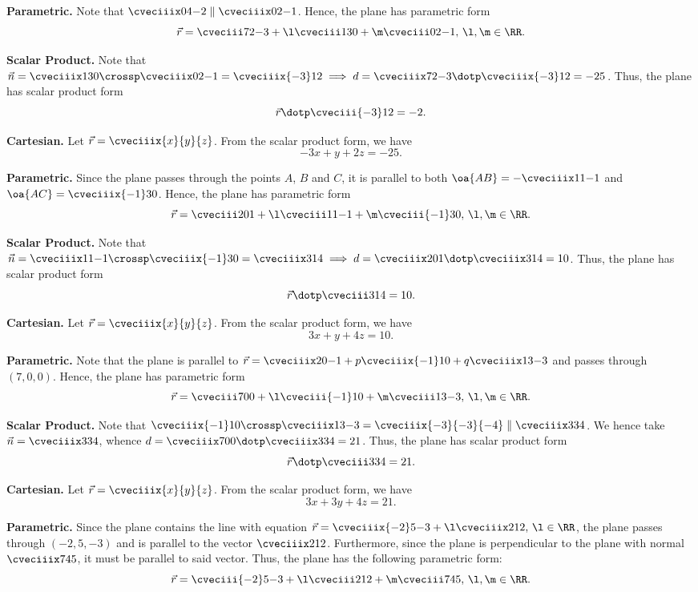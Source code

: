 \begin{solution}
    \begin{ppart}
        \textbf{Parametric.}
        Note that $\cveciiix04{-2} \parallel \cveciiix02{-1}$. Hence, the plane has parametric form \[\vec r = \cveciii72{-3} + \l\cveciii130 + \m\cveciii02{-1}, \, \l, \m \in \RR.\]

        \textbf{Scalar Product.}
        Note that $\vec n = \cveciiix130 \crossp \cveciiix02{-1} = \cveciiix{-3}12 \implies d = \cveciiix72{-3} \dotp \cveciiix{-3}12 = -25$. Thus, the plane has scalar product form \[\vec r \dotp \cveciii{-3}12 = -2.\]

        \textbf{Cartesian.} Let $\vec r = \cveciiix{x}{y}{z}$. From the scalar product form, we have \[-3x + y + 2z = -25.\]
    \end{ppart}
    \begin{ppart}
        \textbf{Parametric.} Since the plane passes through the points $A$, $B$ and $C$, it is parallel to both $\oa{AB} = -\cveciiix11{-1}$ and $\oa{AC}= \cveciiix{-1}30$. Hence, the plane has parametric form \[\vec r = \cveciii201 + \l\cveciii11{-1} + \m\cveciii{-1}30, \, \l, \m \in \RR.\]

        \textbf{Scalar Product.} Note that $\vec n = \cveciiix11{-1} \crossp \cveciiix{-1}30 = \cveciiix314 \implies d = \cveciiix201 \dotp \cveciiix314 = 10$. Thus, the plane has scalar product form \[\vec r \dotp \cveciii314 = 10.\]

        \textbf{Cartesian.} Let $\vec r = \cveciiix{x}{y}{z}$. From the scalar product form, we have \[3x + y + 4z = 10.\]
    \end{ppart}
    \begin{ppart}
        \textbf{Parametric.} Note that the plane is parallel to $\vec r = \cveciiix20{-1} + p\cveciiix{-1}10 + q\cveciiix13{-3}$ and passes through $(7, 0, 0)$. Hence, the plane has parametric form \[\vec r = \cveciii700 + \l\cveciii{-1}10 + \m\cveciii13{-3}, \, \l, \m \in \RR.\]

        \textbf{Scalar Product.} Note that $\cveciiix{-1}10 \crossp \cveciiix13{-3} = \cveciiix{-3}{-3}{-4} \parallel \cveciiix334$. We hence take $\vec n = \cveciiix334$, whence $d = \cveciiix700 \dotp \cveciiix334 = 21$. Thus, the plane has scalar product form \[\vec r \dotp \cveciii334 = 21.\]

        \textbf{Cartesian.} Let $\vec r = \cveciiix{x}{y}{z}$. From the scalar product form, we have \[3x + 3y + 4z = 21.\]
    \end{ppart}
    \begin{ppart}
        \textbf{Parametric.} Since the plane contains the line with equation $\vec r = \cveciiix{-2}5{-3} + \l\cveciiix212, \, \l \in \RR$, the plane passes through $(-2, 5, -3)$ and is parallel to the vector $\cveciiix212$. Furthermore, since the plane is perpendicular to the plane with normal $\cveciiix745$, it must be parallel to said vector. Thus, the plane has the following parametric form: \[\vec r = \cveciii{-2}5{-3} + \l\cveciii212 + \m\cveciii745, \, \l, \m \in \RR.\]


\end{ppart}
\end{solution}
